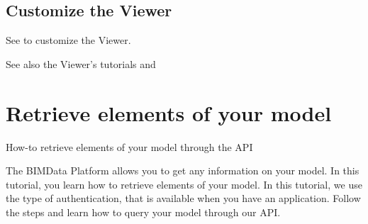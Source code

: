\documentclass[a4paper,12pt,english]{sphinxmanual}
\begin{document}
%
\begin{sphinxVerbatim}[commandchars=\\\{\}]
   
   
   
   

     
 
 
 
 
\end{sphinxVerbatim}


\subsection{Customize the Viewer}
\label{\detokenize{viewer/getting_started:customize-the-viewer}}
See {\hyperref[\detokenize{viewer/parameters::doc}]{}} to customize the Viewer.




See also the Viewer’s tutorials {\hyperref[\detokenize{viewer/viewfit_focus::doc}]{}}
and {\hyperref[\detokenize{viewer/example_doors::doc}]{}}




\section{Retrieve elements of your model}
\label{\detokenize{tutorials/retrieve-elements:retrieve-elements-of-your-model}}\label{\detokenize{tutorials/retrieve-elements::doc}}
\begin{sphinxShadowBox}

How-to retrieve elements of your model through the API
\end{sphinxShadowBox}

The BIMData Platform allows you to get any information on your model. In this tutorial, you learn how to retrieve elements of your model.
In this tutorial, we use the  type of authentication, that is available when you have an application.
Follow the steps and learn how to query your model through our API.
\end{document}
